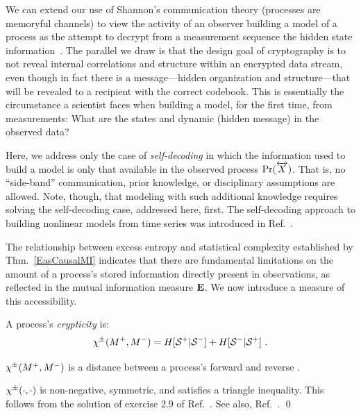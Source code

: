 We can extend our use of Shannon's communication theory (processes are memoryful
channels) to view the activity of an observer building a model of a process as
the attempt to decrypt from a measurement sequence the hidden state 
information~\cite{Shan49a}. The parallel we draw is that the design goal of 
cryptography is to not reveal internal correlations and structure within an 
encrypted data stream, even though in fact there is a message---hidden 
organization and structure---that will be revealed to a recipient with the 
correct codebook. This is essentially the circumstance a scientist faces when 
building a model, for the first time, from measurements: What are the states 
and dynamic (hidden message) in the observed data?

Here, we address only the case of \emph{self-decoding} in which the information
used to build a model is only that available in the observed process
$\Pr(\smash{\overleftrightarrow {{X}}})$. That is, no ``side-band'' communication, prior knowledge,
or disciplinary assumptions are allowed. Note, though, that modeling with such
additional knowledge requires solving the self-decoding case, addressed here,
first. The self-decoding approach to building nonlinear models from time series
was introduced in Ref.~\cite{Pack80}.

The relationship between excess entropy and statistical complexity established
by Thm.~\ref{EasCausalMI} indicates that there are fundamental limitations on
the amount of a process's stored information directly present in
observations, as reflected in the mutual information measure ${\bf E}$.
We now introduce a measure of this accessibility.

\begin{Def} A process's \emph{crypticity} is:
\begin{equation}
\chi^{\pm}({M}^{+},{M}^{-}) =
	H[{\mathcal{S}}^{+}|{\mathcal{S}}^{-}]
	+ H[{\mathcal{S}}^{-}|{\mathcal{S}}^{+}] ~.
\end{equation}
\end{Def}

\begin{Prop}
$\chi^{\pm}({M}^{+},{M}^{-})$ is a distance between a process's forward and
reverse \eMs.
\label{Prop:PCisaDistance}
\end{Prop}

\begin{ProProp}
$\chi^{\pm}(\cdot,\cdot)$ is non-negative, symmetric, and satisfies a triangle
inequality. This follows from the solution of exercise 2.9 of Ref.~\cite{Cove06a}.
See also, Ref.~\cite{Crut87f}.
\qed
\end{ProProp}

